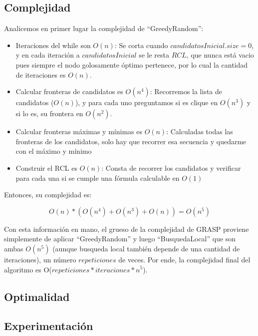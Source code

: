 \subsection{Complejidad}

Analicemos en primer lugar la complejidad de ``GreedyRandom'': \\

\begin{itemize}
    \item Iteraciones del while son $O(n)$: Se corta cuando $candidatosInicial.size = 0$, y en cada iteración a $candidatosInicial$ se le resta $RCL$, que nunca está vacio pues siempre el nodo golosamente óptimo pertenece, por lo cual la cantidad de iteraciones es $O(n)$.
    \item Calcular fronteras de candidatos es $O(n^4)$: Recorremos la lista de candidatos ($O(n)$), y para cada uno preguntamos si es clique en $O(n^3)$ y si lo es, su frontera en $O(n^2)$.
    \item Calcular fronteras máximas y mínimas es $O(n)$: Calculadas todas las fronteras de los candidatos, solo hay que recorrer esa secuencia y quedarme con el máximo y mínimo
    \item Construir el RCL es $O(n)$: Consta de recorrer los candidatos y verificar para cada una si se cumple una fórmula calculable en $O(1)$
\end{itemize}

Entonces, su complejidad es:

$$ O(n) * (O(n^4) + O(n^3) + O(n)) = O(n^5)$$

Con esta información en mano, el grueso de la complejidad de GRASP proviene simplemente de aplicar ``GreedyRandom'' y luego ``BusquedaLocal'' que son ambas $O(n^5)$ (aunque busqueda local también depende de una cantidad de iteraciones), un número $repeticiones$ de veces. Por ende, la complejidad final del algoritmo es O($repeticiones * iteraciones * n^5$).


\subsection{Optimalidad}


\subsection{Experimentación}


